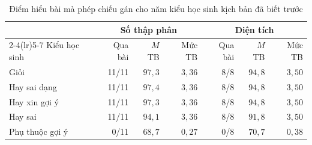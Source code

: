\begin{table}[H]
\centering
\caption{Điểm hiểu bài mà phép chiếu gán cho năm kiểu học sinh kịch bản đã biết trước}\label{tab:learner-groups}
\small
\begin{tabular}{lrrrrrr}
\toprule
& \multicolumn{3}{c}{Số thập phân} & \multicolumn{3}{c}{Diện tích}\\
\cmidrule(lr){2-4}\cmidrule(lr){5-7}
Kiểu học sinh & Qua bài & $M$ TB & Mức TB & Qua bài & $M$ TB & Mức TB \\
\midrule
Giỏi & 11/11 & $97{,}3$ & $3{,}36$ & 8/8 & $94{,}8$ & $3{,}50$ \\
Hay sai dạng & 11/11 & $97{,}4$ & $3{,}36$ & 8/8 & $94{,}8$ & $3{,}50$ \\
Hay xin gợi ý & 11/11 & $97{,}3$ & $3{,}36$ & 8/8 & $94{,}8$ & $3{,}50$ \\
Hay sai & 11/11 & $94{,}1$ & $3{,}36$ & 8/8 & $91{,}8$ & $3{,}50$ \\
Phụ thuộc gợi ý & 0/11 & $68{,}7$ & $0{,}27$ & 0/8 & $70{,}7$ & $0{,}38$ \\
\bottomrule
\end{tabular}
\end{table}
